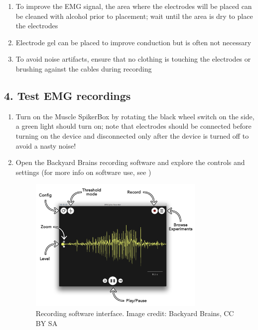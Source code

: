 \documentclass[12pt]{article}
\begin{document}
\begin{enumerate}
\item To improve the EMG signal, the area where the electrodes will be placed can be cleaned with alcohol prior to placement; wait until the area is dry to place the electrodes
\item Electrode gel can be placed to improve conduction but is often not necessary
\item To avoid noise artifacts, ensure that no clothing is touching the electrodes or brushing against the cables during recording
\end{enumerate}
 
\subsection*{4. Test EMG recordings}

\begin{enumerate}
\item Turn on the Muscle SpikerBox by rotating the black wheel switch on the side, a green light should turn on; note that electrodes should be connected before turning on the device and disconnected only after the device is turned off to avoid a nasty noise!
\item Open the Backyard Brains recording software and explore the controls and settings (for more info on software use, see \cite{spikeRecorder})

\begin{figure}[h!]
\centering
\includegraphics[width=0.8\textwidth]{images/BBrecorder.png}
\caption{Recording software interface. Image credit: Backyard Brains, CC BY SA}
\label{fig:recorder}
\end{figure}


\end{enumerate}
\end{document}
